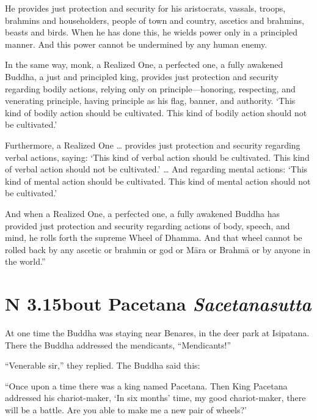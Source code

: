 \documentclass[12pt,openany]{book}%
\newcommand*{\suttatitleacronym}[1]{\smaller[2]{#1}\vspace*{.3em}}
\newcommand*{\suttatitletranslation}[1]{\linebreak{#1}}
\newcommand*{\suttatitleroot}[1]{\linebreak\smaller[2]\itshape{#1}}
\newcommand*{\tocacronym}[1]{\hspace*{-3.3em}{#1}\quad}
\newcommand*{\toctranslation}[1]{#1}
\newcommand*{\tocroot}[1]{(\textit{#1})}
\begin{document}
He provides just protection and security for his aristocrats, vassals, troops, brahmins and householders, people of town and country, ascetics and brahmins, beasts and birds. When he has done this, he wields power only in a principled manner. And this power cannot be undermined by any human enemy. 

In the same way, monk, a Realized One, a perfected one, a fully awakened Buddha, a just and principled king, provides just protection and security regarding bodily actions, relying only on principle—honoring, respecting, and venerating principle, having principle as his flag, banner, and authority. ‘This kind of bodily action should be cultivated. This kind of bodily action should not be cultivated.’ 

Furthermore, a Realized One … provides just protection and security regarding verbal actions, saying: ‘This kind of verbal action should be cultivated. This kind of verbal action should not be cultivated.’ … And regarding mental actions: ‘This kind of mental action should be cultivated. This kind of mental action should not be cultivated.’ 

And when a Realized One, a perfected one, a fully awakened Buddha has provided just protection and security regarding actions of body, speech, and mind, he rolls forth the supreme Wheel of Dhamma. And that wheel cannot be rolled back by any ascetic or brahmin or god or \textsanskrit{Māra} or \textsanskrit{Brahmā} or by anyone in the world.” 

%
\section*{{\suttatitleacronym AN 3.15}{\suttatitletranslation About Pacetana }{\suttatitleroot Sacetanasutta}}
\addcontentsline{toc}{section}{\tocacronym{AN 3.15} \toctranslation{About Pacetana } \tocroot{Sacetanasutta}}

At one time the Buddha was staying near Benares, in the deer park at Isipatana. There the Buddha addressed the mendicants, “Mendicants!” 

“Venerable sir,” they replied. The Buddha said this: 

“Once upon a time there was a king named Pacetana. Then King Pacetana addressed his chariot-maker, ‘In six months’ time, my good chariot-maker, there will be a battle. Are you able to make me a new pair of wheels?’ 
\end{document}
